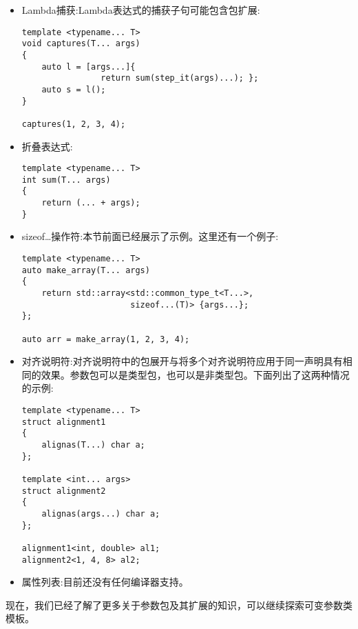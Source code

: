 \begin{itemize}
\begin{lstlisting}[style=styleCXX]
struct B
{
	void execute() { std::cout << "B::execute\n"; }
};

struct C
{
	void execute() { std::cout << "C::execute\n"; }
};

template<typename... Bases>
struct X : public Bases...
{
	X(Bases const & ... args) : Bases(args)...
	{}
	
	using Bases::execute...;
};

A a;
B b;
C c;
X x(a, b, c);

x.A::execute();
x.B::execute();
x.C::execute();
\end{lstlisting}

\item
Lambda捕获:Lambda表达式的捕获子句可能包含包扩展:

\begin{lstlisting}[style=styleCXX]
template <typename... T>
void captures(T... args)
{
	auto l = [args...]{
		        return sum(step_it(args)...); };
	auto s = l();
}

captures(1, 2, 3, 4);
\end{lstlisting}

\item
折叠表达式:

\begin{lstlisting}[style=styleCXX]
template <typename... T>
int sum(T... args)
{
	return (... + args);
}
\end{lstlisting}

\item
sizeof…操作符:本节前面已经展示了示例。这里还有一个例子:

\begin{lstlisting}[style=styleCXX]
template <typename... T>
auto make_array(T... args)
{
	return std::array<std::common_type_t<T...>,
	                  sizeof...(T)> {args...};
};

auto arr = make_array(1, 2, 3, 4);
\end{lstlisting}

\item
对齐说明符:对齐说明符中的包展开与将多个对齐说明符应用于同一声明具有相同的效果。参数包可以是类型包，也可以是非类型包。下面列出了这两种情况的示例:

\begin{lstlisting}[style=styleCXX]
template <typename... T>
struct alignment1
{
	alignas(T...) char a;
};

template <int... args>
struct alignment2
{
	alignas(args...) char a;
};

alignment1<int, double> al1;
alignment2<1, 4, 8> al2;
\end{lstlisting}

\item
属性列表:目前还没有任何编译器支持。
\end{itemize}

现在，我们已经了解了更多关于参数包及其扩展的知识，可以继续探索可变参数类模板。








